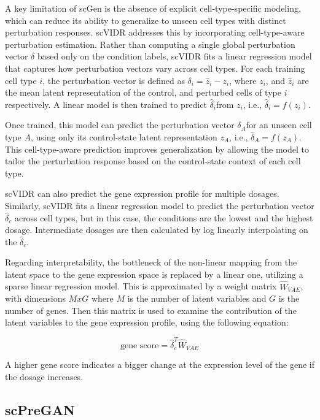\documentclass[12pt, a4paper]{article}
\begin{document}
A key limitation of scGen is the absence of explicit cell-type-specific modeling, which can reduce its ability to generalize to unseen cell types with distinct perturbation responses.
scVIDR addresses this by incorporating cell-type-aware perturbation estimation. Rather than computing a single global perturbation vector $\delta$ based only on the condition labels, scVIDR fits a linear regression model that captures how perturbation vectors vary across cell types.
For each training cell type $i$, the perturbation vector is defined as $\delta_i = \hat{z}_i - z_i$,
where $z_i$​, and $\hat{z}_i$ are the mean latent representation of the control, and perturbed cells of type $i$ respectively.
A linear model is then trained to predict $\hat{\delta}_i$​ from $z_i$, i.e., $\hat{\delta}_i = f(z_i)$.


Once trained, this model can predict the perturbation vector $\delta_A$​ for an unseen cell type $A$, using only its control-state latent representation $z_A$, i.e., $\hat{\delta}_A = f(z_A)$.
This cell-type-aware prediction improves generalization by allowing the model to tailor the perturbation response based on the control-state context of each cell type.

scVIDR can also predict the gene expression profile for multiple dosages. Similarly, scVIDR fits a linear regression model to predict the perturbation vector $\hat{\delta}_c$ across cell types, but in this case, the conditions are the lowest and the highest dosage. Intermediate dosages are then calculated by log linearly interpolating on the $\hat{\delta}_c$.

Regarding interpretability, the bottleneck of the non-linear mapping from the latent space to the gene expression space is replaced by a linear one, utilizing a sparse linear regression model. This is approximated by a weight matrix $\hat{W}_{VAE}$, with dimensions $MxG$ where $M$ is the number of latent variables and $G$ is the number of genes. Then this matrix is used to examine the contribution of the latent variables to the gene expression profile, using the following equation:

\[\text{gene score} = \hat{\delta}_c^T \hat{W}_{VAE}\]

A higher gene score indicates a bigger change at the expression level of the gene if the dosage increases.

\subsection{scPreGAN}
\end{document}

